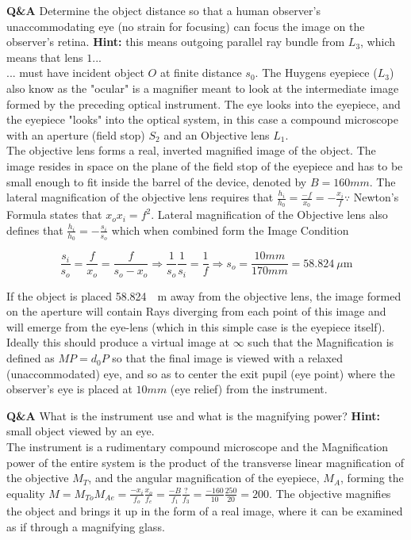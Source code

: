 \documentclass[main.tex]{subfiles}
\begin{document}
\textbf{Q\&A} Determine the object distance so that a human observer's unaccommodating eye (no strain for focusing) can focus the image on the observer's retina. \textbf{Hint:} this means outgoing parallel ray bundle from $L_3$, which means that lens $1 ...$\\

... must have incident object $O$ at finite distance $s_0$. The Huygens eyepiece ($L_3$) also know as the "ocular" is a magnifier meant to look at the intermediate image formed by the preceding optical instrument. The eye looks into the eyepiece, and the eyepiece "looks" into the optical system, in this case a compound microscope with an aperture (field stop) $S_2$ and an Objective lens $L_1$.\\

The objective lens forms a real, inverted magnified image of the object. The image resides in space on the plane of the field stop of the eyepiece and has to be small enough to fit inside the barrel of the device, denoted by $B=160mm$. The lateral magnification of the objective lens requires that $\frac{h_i}{h_0} = \frac{-f}{x_0} = -\frac{x_i}{f} \because$ Newton's Formula states that $x_o x_i = f^2$. Lateral magnification of the Objective lens also defines that $\frac{h_i}{h_0} = -\frac{s_i}{s_o}$ which when combined form the Image Condition

\begin{equation}
\frac{s_i}{s_o} = \frac{f}{x_o} = \frac{f}{s_o - x_o} \Rightarrow \frac{1}{s_o} \frac{1}{s_i} = \frac{1}{f} \Rightarrow s_o = \frac{10mm}{170mm} = \SI{58.824}{\mu \meter} 
\end{equation}


If the object is placed \SI{58.824}{\mu \meter} away from the objective lens, the image formed on the aperture will contain Rays diverging from each point of this image and will emerge from the eye-lens (which in this simple case is the eyepiece itself).\\ 


Ideally this should produce a virtual image at $\infty$ such that the Magnification is defined as $MP=d_0P$ so that the final image is viewed with a relaxed (unaccommodated) eye, and so as to center the exit pupil (eye point) where the observer's eye is placed at $10mm$ (eye relief) from the instrument.\\

\fi

\textbf{Q\&A} What is the instrument use and what is the magnifying power? \textbf{Hint:} small object viewed by an eye.\\

The instrument is a rudimentary compound microscope and the Magnification power of the entire system is the product of the transverse linear magnification of the objective $M_T$, and the angular magnification of the eyepiece, $M_A$, forming the equality $M = M_{To} M_{Ae} = \frac{-x_i}{f_o} \frac{x_o}{f_e} = \frac{-B}{f_1} \frac{?}{f_3} = \frac{-160}{10} \frac{250}{20} = 200$. The objective magnifies the object and brings it up in the form of a real image, where it can be examined as if through a magnifying glass.

\end{document}
